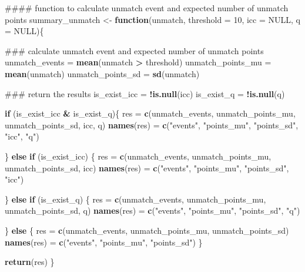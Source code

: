 \documentclass[]{article}
\newenvironment{Shaded}{\begin{snugshade}}{\end{snugshade}}
\newcommand{\KeywordTok}[1]{\textcolor[rgb]{0.13,0.29,0.53}{\textbf{#1}}}
\newcommand{\DataTypeTok}[1]{\textcolor[rgb]{0.13,0.29,0.53}{#1}}
\newcommand{\DecValTok}[1]{\textcolor[rgb]{0.00,0.00,0.81}{#1}}
\newcommand{\StringTok}[1]{\textcolor[rgb]{0.31,0.60,0.02}{#1}}
\newcommand{\OtherTok}[1]{\textcolor[rgb]{0.56,0.35,0.01}{#1}}
\newcommand{\ControlFlowTok}[1]{\textcolor[rgb]{0.13,0.29,0.53}{\textbf{#1}}}
\newcommand{\OperatorTok}[1]{\textcolor[rgb]{0.81,0.36,0.00}{\textbf{#1}}}
\newcommand{\NormalTok}[1]{#1}
\begin{document}
\begin{Shaded}
\begin{Highlighting}[]
\NormalTok{#### function to calculate unmatch event and expected number of unmatch points}
\NormalTok{summary_unmatch <-}\StringTok{ }\ControlFlowTok{function}\NormalTok{(unmatch, }\DataTypeTok{threshold =} \DecValTok{10}\NormalTok{, }\DataTypeTok{icc =} \OtherTok{NULL}\NormalTok{, }\DataTypeTok{q =} \OtherTok{NULL}\NormalTok{)\{}
    
\NormalTok{    ### calculate unmatch event and expected number of unmatch points }
\NormalTok{    unmatch_events    =}\StringTok{ }\KeywordTok{mean}\NormalTok{(unmatch }\OperatorTok{>}\StringTok{ }\NormalTok{threshold)}
\NormalTok{    unmatch_points_mu =}\StringTok{ }\KeywordTok{mean}\NormalTok{(unmatch)}
\NormalTok{    unmatch_points_sd =}\StringTok{ }\KeywordTok{sd}\NormalTok{(unmatch)}
    
\NormalTok{    ### return the results}
\NormalTok{    is_exist_icc =}\StringTok{ }\OperatorTok{!}\KeywordTok{is.null}\NormalTok{(icc)}
\NormalTok{    is_exist_q   =}\StringTok{ }\OperatorTok{!}\KeywordTok{is.null}\NormalTok{(q)}
    
    \ControlFlowTok{if}\NormalTok{ (is_exist_icc }\OperatorTok{&}\StringTok{ }\NormalTok{is_exist_q)\{}
\NormalTok{        res =}\StringTok{ }\KeywordTok{c}\NormalTok{(unmatch_events, unmatch_points_mu, unmatch_points_sd, icc, q)}
        \KeywordTok{names}\NormalTok{(res) =}\StringTok{ }\KeywordTok{c}\NormalTok{(}\StringTok{"events"}\NormalTok{, }\StringTok{"points_mu"}\NormalTok{, }\StringTok{"points_sd"}\NormalTok{, }\StringTok{"icc"}\NormalTok{, }\StringTok{"q"}\NormalTok{)}
        
\NormalTok{    \} }\ControlFlowTok{else} \ControlFlowTok{if}\NormalTok{ (is_exist_icc) \{}
\NormalTok{        res =}\StringTok{ }\KeywordTok{c}\NormalTok{(unmatch_events, unmatch_points_mu, unmatch_points_sd, icc)}
        \KeywordTok{names}\NormalTok{(res) =}\StringTok{ }\KeywordTok{c}\NormalTok{(}\StringTok{"events"}\NormalTok{, }\StringTok{"points_mu"}\NormalTok{, }\StringTok{"points_sd"}\NormalTok{, }\StringTok{"icc"}\NormalTok{)}
        
\NormalTok{    \} }\ControlFlowTok{else} \ControlFlowTok{if}\NormalTok{ (is_exist_q) \{}
\NormalTok{        res =}\StringTok{ }\KeywordTok{c}\NormalTok{(unmatch_events, unmatch_points_mu, unmatch_points_sd, q)}
        \KeywordTok{names}\NormalTok{(res) =}\StringTok{ }\KeywordTok{c}\NormalTok{(}\StringTok{"events"}\NormalTok{, }\StringTok{"points_mu"}\NormalTok{, }\StringTok{"points_sd"}\NormalTok{, }\StringTok{"q"}\NormalTok{)}
        
\NormalTok{    \} }\ControlFlowTok{else}\NormalTok{ \{}
\NormalTok{        res =}\StringTok{ }\KeywordTok{c}\NormalTok{(unmatch_events, unmatch_points_mu, unmatch_points_sd)}
        \KeywordTok{names}\NormalTok{(res) =}\StringTok{ }\KeywordTok{c}\NormalTok{(}\StringTok{"events"}\NormalTok{, }\StringTok{"points_mu"}\NormalTok{, }\StringTok{"points_sd"}\NormalTok{)}
\NormalTok{    \}}
    
    \KeywordTok{return}\NormalTok{(res)}
\NormalTok{\}}
\end{Highlighting}
\end{Shaded}
\end{document}
